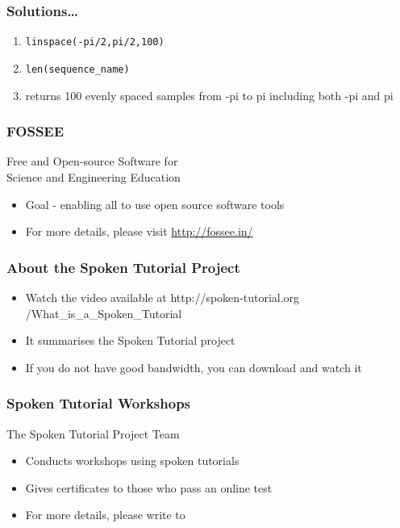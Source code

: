 \documentclass[17pt,compress]{beamer}
\begin{document}
\begin{frame}
\frametitle{Solutions\ldots{}}
\label{sec-8}
\begin{enumerate}
\item \texttt{linspace(-pi/2,pi/2,100)}\pause
\item \texttt{len(sequence\_name)}\pause
\item returns 100 evenly spaced samples from -pi to pi including both -pi and pi
\end{enumerate}
\end{frame}
\begin{frame}
\frametitle{FOSSEE}
{\color{blue}Free and Open-source Software for \\Science and Engineering Education} \\
\begin{itemize}
\item Goal - enabling all to use open source software tools
\item For more details, please visit {\color{blue}\url{http://fossee.in/}}
\end{itemize}
\end{frame}
\begin{frame}
\frametitle{About the Spoken Tutorial Project}
\begin{itemize}
\item Watch the video available at {\color{blue}http://spoken-tutorial.org /What\_is\_a\_Spoken\_Tutorial}
\item It summarises the Spoken Tutorial project \pause
\item If you do not have good bandwidth, you can download and watch it
\end{itemize}
\end{frame}
\begin{frame}
\frametitle{Spoken Tutorial Workshops}The Spoken Tutorial Project Team 
\begin{itemize}
\item Conducts workshops using spoken tutorials 
\item Gives certificates to those who pass an online test 
\item For more details, please write to \\ 
\end{itemize}
\end{frame}
\end{document}
